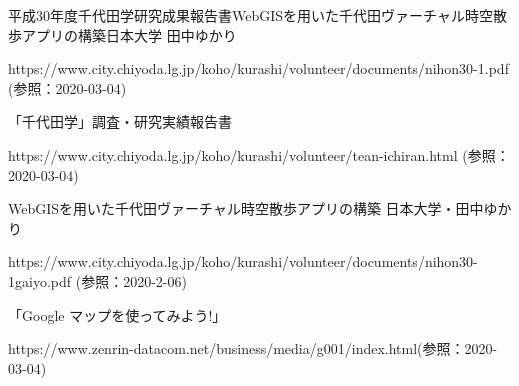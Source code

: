 \documentclass[a4paper, twoside]{jarticle}
\begin{document}
\begin{thebibliography}{99}

平成30年度千代田学研究成果報告書WebGISを用いた千代田ヴァーチャル時空散歩アプリの構築日本大学 田中ゆかり\par
https://www.city.chiyoda.lg.jp/koho/kurashi/volunteer/documents/nihon30-1.pdf (参照：2020-03-04)

「千代田学」調査・研究実績報告書\par
https://www.city.chiyoda.lg.jp/koho/kurashi/volunteer/tean-ichiran.html (参照：2020-03-04)

 WebGISを用いた千代田ヴァーチャル時空散歩アプリの構築 日本大学・田中ゆかり\par
https://www.city.chiyoda.lg.jp/koho/kurashi/volunteer/documents/nihon30-1gaiyo.pdf (参照：2020-2-06)

 「Google マップを使ってみよう!」\par
https://www.zenrin-datacom.net/business/media/g001/index.html(参照：2020-03-04)



\end{thebibliography}
\end{document}
